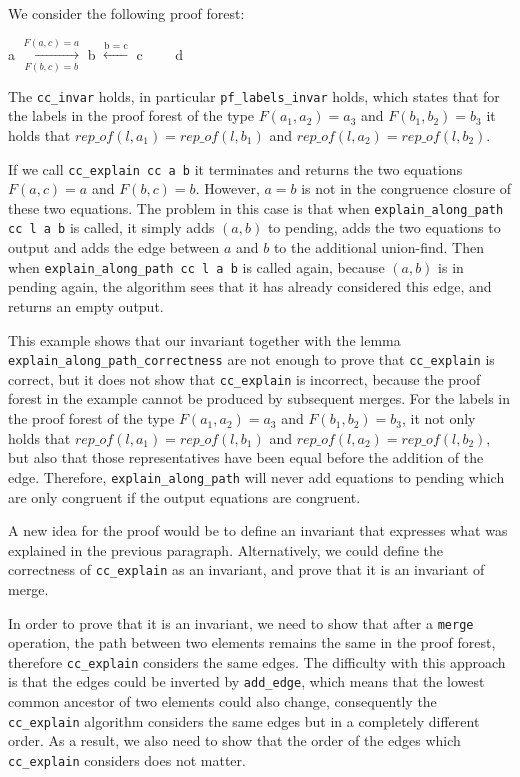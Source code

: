 \begin{exmp}
We consider the following proof forest:

a $\xrightarrow[F(b,c) = b]{F(a,c) = a}$ b $\xleftarrow{\text{b = c}}$ c \ \ \ \ d

The \lstinline{cc_invar} holds, in particular \lstinline{pf_labels_invar} holds, which states that for the labels in the proof forest of the type $F(a_1, a_2) = a_3$ and $F(b_1, b_2) = b_3$ it holds that $rep\_of(l, a_1) = rep\_of(l, b_1)$ and $rep\_of(l, a_2) = rep\_of(l, b_2)$.

If we call \lstinline{cc_explain cc a b} it terminates and returns the two equations $F(a,c) = a$ and $F(b,c) = b$.
However, $a = b$ is not in the congruence closure of these two equations.
The problem in this case is that when \lstinline{explain_along_path cc l a b} is called, it simply adds $(a, b)$ to pending, adds the two equations to output and adds the edge between $a$ and $b$ to the additional union-find. Then when \lstinline{explain_along_path cc l a b} is called again, because $(a,b)$ is in pending again, the algorithm sees that it has already considered this edge, and returns an empty output.
\end{exmp}

This example shows that our invariant together with the lemma \lstinline{explain_along_path_correctness} are not enough to prove that \lstinline{cc_explain} is correct, but it does not show that \lstinline{cc_explain} is incorrect, because the proof forest in the example cannot be produced by subsequent merges. For the labels in the proof forest of the type $F(a_1, a_2) = a_3$ and $F(b_1, b_2) = b_3$, it not only holds that $rep\_of(l, a_1) = rep\_of(l, b_1)$ and $rep\_of(l, a_2) = rep\_of(l, b_2)$, but also that those representatives have been equal before the addition of the edge. Therefore, \lstinline{explain_along_path} will never add equations to pending which are only congruent if the output equations are congruent.

A new idea for the proof would be to define an invariant that expresses what was explained in the previous paragraph. Alternatively, we could define the correctness of \lstinline{cc_explain} as an invariant, and prove that it is an invariant of merge.

In order to prove that it is an invariant, we need to show that after a \lstinline{merge} operation, the path between two elements remains the same in the proof forest, therefore \lstinline{cc_explain} considers the same edges. The difficulty with this approach is that the edges could be inverted by \lstinline{add_edge}, which means that the lowest common ancestor of two elements could also change, consequently the \lstinline{cc_explain} algorithm considers the same edges but in a completely different order. As a result, we also need to show that the order of the edges which \lstinline{cc_explain} considers does not matter.